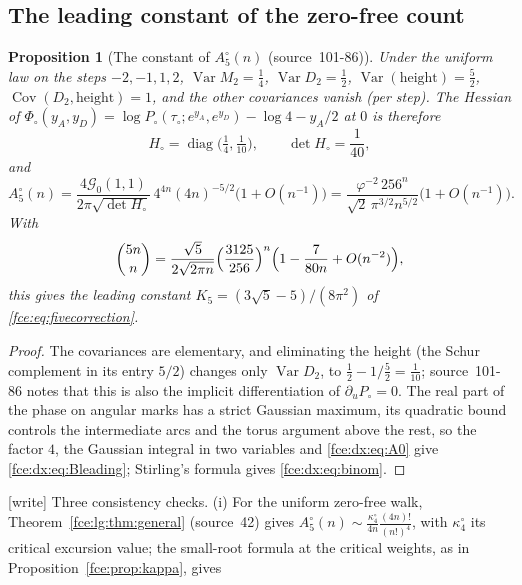 \documentclass[11pt,a4paper]{article}
\numberwithin{equation}{section}
\newtheorem{proposition}[theorem]{Proposition}
\theoremstyle{definition}\newtheorem{definition}[theorem]{Definition}
\theoremstyle{remark}\newtheorem{remark}[theorem]{Remark}
\newcommand{\Var}{\operatorname{Var}}
\newcommand{\Cov}{\operatorname{Cov}}
\begin{document}
\subsection{The leading constant of the zero-free count}\label{fce:dx:sec:Bn}
\begin{proposition}[The constant of $A^\circ_5(n)$ (source~101-86)]\label{fce:dx:prop:Bn}
Under the uniform law on the steps $-2,-1,1,2$, $\Var M_2=\frac14$,
$\Var D_2=\frac12$, $\Var(\text{height})=\frac52$,
$\Cov(D_2,\text{height})=1$, and the other covariances vanish (per step).
The Hessian of
$\Phi_\circ(y_A,y_D)=\log P_\circ(\tau_\circ;e^{y_A},e^{y_D})-\log4-y_A/2$
at $0$ is therefore
\begin{equation}\label{fce:dx:eq:Hcirc}
 H_\circ=\operatorname{diag}\bigl(\tfrac14,\tfrac1{10}\bigr),\qquad \det H_\circ=\frac1{40},
\end{equation}
and
\begin{equation}\label{fce:dx:eq:Bleading}
 A^\circ_5(n)=\frac{4\mathcal G_0(1,1)}{2\pi\sqrt{\det H_\circ}}\,4^{4n}(4n)^{-5/2}\bigl(1+O(n^{-1})\bigr)
 =\frac{\varphi^{-2}\,256^n}{\sqrt2\,\pi^{3/2}n^{5/2}}\bigl(1+O(n^{-1})\bigr).
\end{equation}
With
\begin{equation}\label{fce:dx:eq:binom}
 \binom{5n}n=\frac{\sqrt5}{2\sqrt{2\pi n}}\Bigl(\frac{3125}{256}\Bigr)^n
 \Bigl(1-\frac7{80n}+O(n^{-2})\Bigr),
\end{equation}
this gives the leading constant $K_5=(3\sqrt5-5)/(8\pi^2)$ of
\eqref{fce:eq:fivecorrection}.
\end{proposition}
\begin{proof}
The covariances are elementary, and eliminating the height (the Schur
complement in its entry $5/2$) changes only $\Var D_2$, to
$\frac12-1/\frac52=\frac1{10}$; source~101-86 notes that this is also the
implicit differentiation of $\partial_uP_\circ=0$. The real part of the phase
on angular marks has a strict Gaussian maximum, its quadratic bound controls
the intermediate arcs and the torus argument above the rest, so the factor
$4$, the Gaussian integral in two variables and \eqref{fce:dx:eq:A0} give
\eqref{fce:dx:eq:Bleading}; Stirling's formula gives \eqref{fce:dx:eq:binom}.
\end{proof}
\textup{[write]} Three consistency checks. (i) For the uniform zero-free walk,
Theorem~\ref{fce:lg:thm:general} (source~42) gives
$A^\circ_5(n)\sim\frac{\kappa^\circ_4}{4n}\frac{(4n)!}{(n!)^4}$, with
$\kappa^\circ_4$ its critical excursion value; the small-root formula at the
critical weights, as in Proposition~\ref{fce:prop:kappa}, gives
\end{document}
